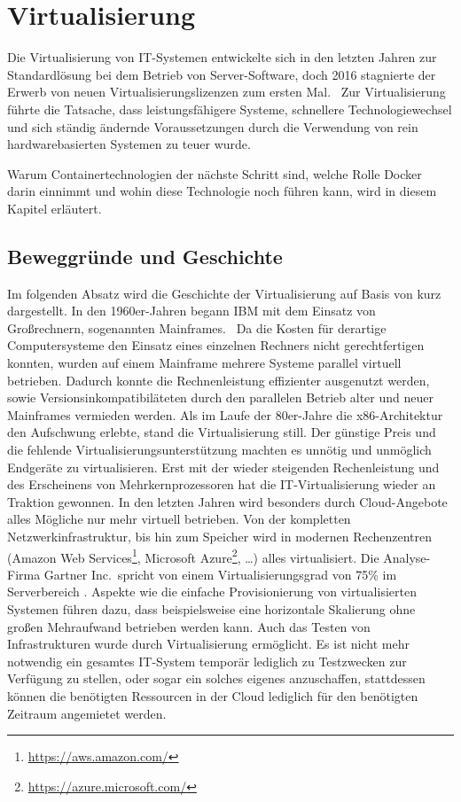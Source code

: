 \chapter{Virtualisierung}
\label{cha:virtualisierung}
Die Virtualisierung von IT-Systemen entwickelte sich in den letzten Jahren zur Standardlösung bei dem Betrieb von Server-Software, doch 2016 stagnierte der Erwerb von neuen Virtualisierungslizenzen zum ersten Mal.~\autocite{Gartner-Magic-Quadrant2016:online}
Zur Virtualisierung führte die Tatsache, dass leistungsfähigere Systeme, schnellere Technologiewechsel und sich ständig ändernde Voraussetzungen durch die Verwendung von rein hardwarebasierten Systemen zu teuer wurde.~\autocite{vmware-virtualization-history:online}

Warum Containertechnologien der nächste Schritt sind, welche Rolle Docker darin einnimmt und wohin diese Technologie noch führen kann, wird in diesem Kapitel erläutert.
\section{Beweggründe und Geschichte}
\label{sec:virtualisierungsgeschichte}
Im folgenden Absatz wird die Geschichte der Virtualisierung auf Basis von \autocite{Baun2009} kurz dargestellt.
In den 1960er-Jahren begann IBM mit dem Einsatz von Großrechnern, sogenannten Mainframes.~\autocite{IBM1981}
Da die Kosten für derartige Computersysteme den Einsatz eines einzelnen Rechners nicht gerechtfertigen konnten, wurden auf einem Mainframe mehrere Systeme parallel virtuell betrieben.
Dadurch konnte die Rechnenleistung effizienter ausgenutzt werden, sowie Versionsinkompatibiläteten durch den parallelen Betrieb alter und neuer Mainframes vermieden werden.
Als im Laufe der 80er-Jahre die x86-Architektur den Aufschwung erlebte, stand die Virtualisierung still.
Der günstige Preis und die fehlende Virtualisierungsunterstützung machten es unnötig und unmöglich Endgeräte zu virtualisieren.
Erst mit der wieder steigenden Rechenleistung und des Erscheinens von Mehrkernprozessoren hat die IT-Virtualisierung wieder an Traktion gewonnen.
In den letzten Jahren wird besonders durch Cloud-Angebote alles Mögliche nur mehr virtuell betrieben.
Von der  kompletten Netzwerkinfrastruktur, bis hin zum Speicher wird in modernen Rechenzentren (Amazon Web Services\footnote{\url{https://aws.amazon.com/}}, Microsoft Azure\footnote{\url{https://azure.microsoft.com/}}, \dots) alles virtualisiert.
Die Analyse-Firma Gartner Inc.\ spricht von einem Virtualisierungsgrad von 75\% im Serverbereich \autocite{Gartner-Server-Virtualization:online}.
Aspekte wie die einfache Provisionierung von virtualisierten Systemen führen dazu, dass beispielsweise eine horizontale Skalierung ohne großen Mehraufwand betrieben werden kann.
Auch das Testen von Infrastrukturen wurde durch Virtualisierung ermöglicht.
Es ist nicht mehr notwendig ein gesamtes IT-System temporär lediglich zu Testzwecken zur Verfügung zu stellen, oder sogar ein solches eigenes anzuschaffen, stattdessen können die benötigten Ressourcen in der Cloud lediglich für den benötigten Zeitraum angemietet werden.

